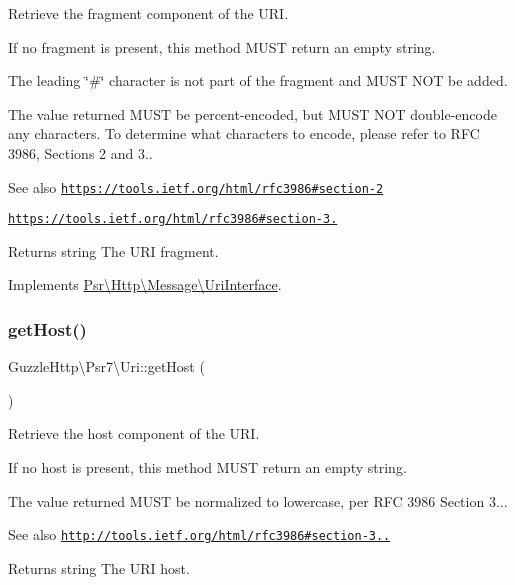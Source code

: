 Retrieve the fragment component of the U\+RI.

If no fragment is present, this method M\+U\+ST return an empty string.

The leading \char`\"{}\#\char`\"{} character is not part of the fragment and M\+U\+ST N\+OT be added.

The value returned M\+U\+ST be percent-\/encoded, but M\+U\+ST N\+OT double-\/encode any characters. To determine what characters to encode, please refer to R\+FC 3986, Sections 2 and 3..

\begin{DoxySeeAlso}{See also}
\href{https://tools.ietf.org/html/rfc3986#section-2}{\tt https\+://tools.\+ietf.\+org/html/rfc3986\#section-\/2} 

\href{https://tools.ietf.org/html/rfc3986#section-3.5}{\tt https\+://tools.\+ietf.\+org/html/rfc3986\#section-\/3.} 
\end{DoxySeeAlso}
\begin{DoxyReturn}{Returns}
string The U\+RI fragment. 
\end{DoxyReturn}


Implements \hyperlink{interfacePsr_1_1Http_1_1Message_1_1UriInterface_a95df80b1a48010817c8c135ef5d9d5b1}{Psr\textbackslash{}\+Http\textbackslash{}\+Message\textbackslash{}\+Uri\+Interface}.

\mbox{\label{classGuzzleHttp_1_1Psr7_1_1Uri_a77cd782c426d48880a457a0a54c46d5d}} 
\subsubsection{\texorpdfstring{get\+Host()}{getHost()}}
{\footnotesize\ttfamily Guzzle\+Http\textbackslash{}\+Psr7\textbackslash{}\+Uri\+::get\+Host (\begin{DoxyParamCaption}{ }\end{DoxyParamCaption})}

Retrieve the host component of the U\+RI.

If no host is present, this method M\+U\+ST return an empty string.

The value returned M\+U\+ST be normalized to lowercase, per R\+FC 3986 Section 3...

\begin{DoxySeeAlso}{See also}
\href{http://tools.ietf.org/html/rfc3986#section-3.2.2}{\tt http\+://tools.\+ietf.\+org/html/rfc3986\#section-\/3..} 
\end{DoxySeeAlso}
\begin{DoxyReturn}{Returns}
string The U\+RI host. 
\end{DoxyReturn}


